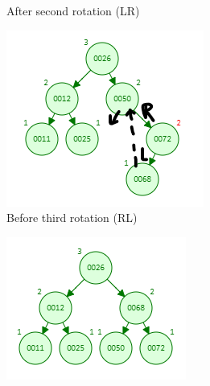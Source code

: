 \documentclass[12pt, a4paper]{article}
\begin{document}
\begin{enumerate}
\begin{figure}[h!]
\begin{subfigure}[b]{0.3\textwidth}
        \caption{After second rotation (LR)}
        \label{fig:1-2-b}
      \end{subfigure}
      \hfill
      \begin{subfigure}[b]{0.3\textwidth}
        \centering
        \includegraphics[width=\textwidth]{1-3-a}
        \caption{Before third rotation (RL)}
        \label{fig:1-3-a}
      \end{subfigure}
      \hfill
      \begin{subfigure}[b]{0.3\textwidth}
        \centering
        \includegraphics[width=\textwidth]{1-3-b}

\end{subfigure}
\end{figure}
\end{enumerate}
\end{document}
